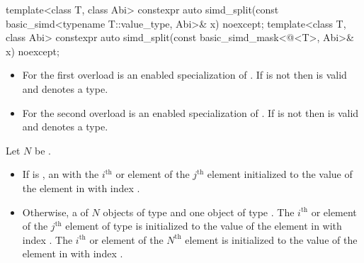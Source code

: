 \begin{itemdecl}
template<class T, class Abi>
  constexpr auto simd_split(const basic_simd<typename T::value_type, Abi>& x) noexcept;
template<class T, class Abi>
  constexpr auto simd_split(const basic_simd_mask<@\maskelementsize@<T>, Abi>& x) noexcept;
\end{itemdecl}

\begin{itemdescr}

  \pnum\constraints
  \begin{itemize}
    \item For the first overload  is an enabled specialization of . If
       is
      not  then  is valid and denotes a type.

    \item For the second overload  is an enabled specialization of .
      If  is not
       then  is valid and denotes a type.
  \end{itemize}

  \pnum Let $N$ be .

    \pnum\returns
    \begin{itemize}
      \item If  is , an  with
        the $i^\text{th}$ \simd or \mask element of the $j^\text{th}$ 
        element initialized to the value of the element in  with index
        .

      \item Otherwise, a  of $N$ objects of type  and one
        object of type .
        The $i^\text{th}$ \simd or \mask element of the $j^\text{th}$
         element of type  is initialized to the value of
        the element in  with index .
        The $i^\text{th}$ \simd or \mask element of the $N^\text{th}$
         element is initialized to the value of the element in
         with index .
    \end{itemize}
  \end{itemdescr}


